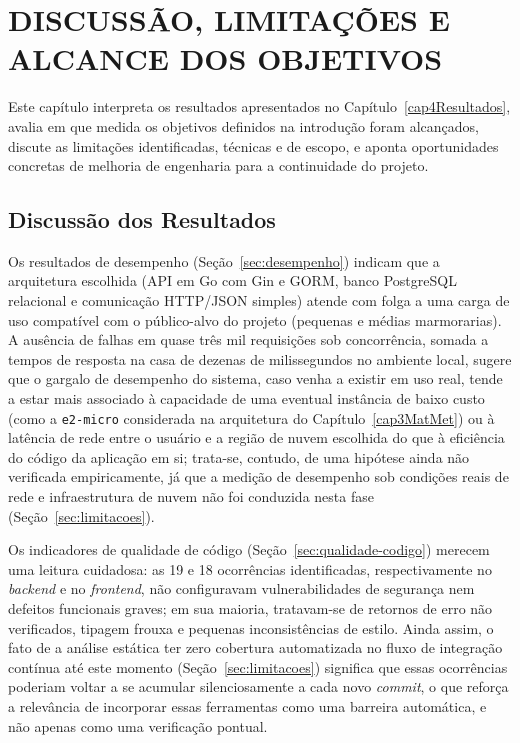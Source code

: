 \chapter{DISCUSSÃO, LIMITAÇÕES E ALCANCE DOS OBJETIVOS}\label{cap5Discussao}

Este capítulo interpreta os resultados apresentados no Capítulo~\ref{cap4Resultados}, avalia em que medida os objetivos definidos na introdução foram alcançados, discute as limitações identificadas, técnicas e de escopo, e aponta oportunidades concretas de melhoria de engenharia para a continuidade do projeto.

\section{Discussão dos Resultados}
\label{sec:discussao-resultados}

Os resultados de desempenho (Seção~\ref{sec:desempenho}) indicam que a arquitetura escolhida (API em Go com Gin e GORM, banco PostgreSQL relacional e comunicação HTTP/JSON simples) atende com folga a uma carga de uso compatível com o público-alvo do projeto (pequenas e médias marmorarias). A ausência de falhas em quase três mil requisições sob concorrência, somada a tempos de resposta na casa de dezenas de milissegundos no ambiente local, sugere que o gargalo de desempenho do sistema, caso venha a existir em uso real, tende a estar mais associado à capacidade de uma eventual instância de baixo custo (como a \texttt{e2-micro} considerada na arquitetura do Capítulo~\ref{cap3MatMet}) ou à latência de rede entre o usuário e a região de nuvem escolhida do que à eficiência do código da aplicação em si; trata-se, contudo, de uma hipótese ainda não verificada empiricamente, já que a medição de desempenho sob condições reais de rede e infraestrutura de nuvem não foi conduzida nesta fase (Seção~\ref{sec:limitacoes}).

Os indicadores de qualidade de código (Seção~\ref{sec:qualidade-codigo}) merecem uma leitura cuidadosa: as 19 e 18 ocorrências identificadas, respectivamente no \textit{backend} e no \textit{frontend}, não configuravam vulnerabilidades de segurança nem defeitos funcionais graves; em sua maioria, tratavam-se de retornos de erro não verificados, tipagem frouxa e pequenas inconsistências de estilo. Ainda assim, o fato de a análise estática ter zero cobertura automatizada no fluxo de integração contínua até este momento (Seção~\ref{sec:limitacoes}) significa que essas ocorrências poderiam voltar a se acumular silenciosamente a cada novo \textit{commit}, o que reforça a relevância de incorporar essas ferramentas como uma barreira automática, e não apenas como uma verificação pontual.

